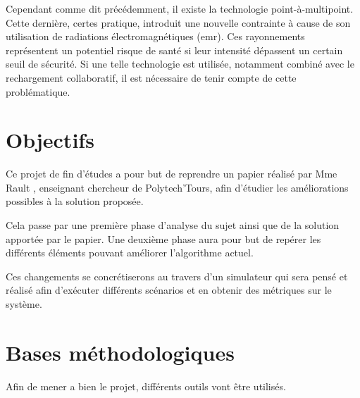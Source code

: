 \documentclass[noposter]{polytech}
\begin{document}
		Cependant comme dit précédemment, il existe la technologie point-à-multipoint.
		Cette dernière, certes pratique, introduit une nouvelle contrainte à cause de son utilisation de radiations électromagnétiques (\gls{emr}).
		Ces rayonnements représentent un potentiel risque de santé si leur intensité dépassent un certain seuil de sécurité.
		Si une telle technologie est utilisée, notamment combiné avec le rechargement collaboratif, il est nécessaire de tenir compte de cette problématique.
		
	\section{Objectifs}
		Ce projet de fin d'études a pour but de reprendre un papier réalisé par Mme Rault \cite{Rault:chargers}, enseignant chercheur de Polytech'Tours, afin d'étudier les améliorations possibles à la solution proposée.
		
		Cela passe par une première phase d'analyse du sujet ainsi que de la solution apportée par le papier.
		Une deuxième phase aura pour but de repérer les différents éléments pouvant améliorer l'algorithme actuel.
		
		Ces changements se concrétiserons au travers d'un simulateur qui sera pensé et réalisé afin d'exécuter différents scénarios et en obtenir des métriques sur le système.
	
	
	\section{Bases méthodologiques}
		Afin de mener a bien le projet, différents outils vont être utilisés.
		
\end{document}
